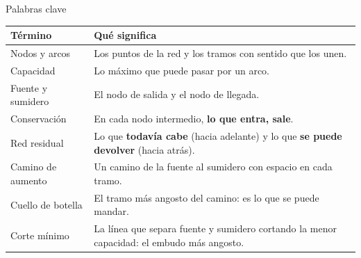 \documentclass[aspectratio=169]{beamer}
\begin{document}
\begin{frame}{Palabras clave}
  \small
  \begin{tabular}{p{3.2cm}p{9.8cm}}
    \toprule
    \textbf{Término} & \textbf{Qué significa} \\
    \midrule
    Nodos y arcos & Los puntos de la red y los tramos con sentido que los unen. \\
    Capacidad & Lo máximo que puede pasar por un arco. \\
    Fuente y sumidero & El nodo de salida y el nodo de llegada. \\
    Conservación & En cada nodo intermedio, \textbf{lo que entra, sale}. \\
    Red residual & Lo que \textbf{todavía cabe} (hacia adelante) y lo que \textbf{se puede devolver} (hacia atrás). \\
    Camino de aumento & Un camino de la fuente al sumidero con espacio en cada tramo. \\
    Cuello de botella & El tramo más angosto del camino: es lo que se puede mandar. \\
    Corte mínimo & La línea que separa fuente y sumidero cortando la menor capacidad: el embudo más angosto. \\
    \bottomrule
  \end{tabular}
\end{frame}
\end{document}
